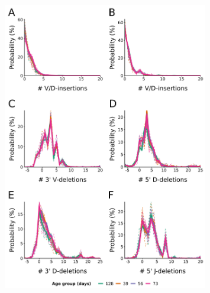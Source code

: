 \begin{figure}
\centering
\includegraphics[width = 0.8\textwidth]{_Figures/png/ageing-igor-indels}
\begin{subfigure}{0em}
\label{fig:igseq-ageing-igor-indels-vdins}
\end{subfigure}
\begin{subfigure}{0em}
\label{fig:igseq-ageing-igor-indels-djins}
\end{subfigure}
\begin{subfigure}{0em}
\label{fig:igseq-ageing-igor-indels-vdel}
\end{subfigure}
\begin{subfigure}{0em}
\label{fig:igseq-ageing-igor-indels-d5del}
\end{subfigure}
\begin{subfigure}{0em}
\label{fig:igseq-ageing-igor-indels-d3del}
\end{subfigure}
\begin{subfigure}{0em}
\label{fig:igseq-ageing-igor-indels-jdel}
\end{subfigure}

\end{figure}
